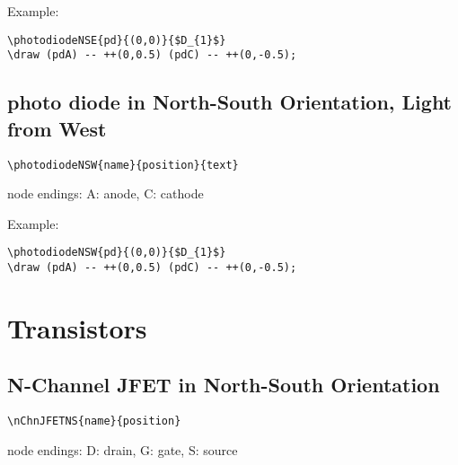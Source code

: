 \documentclass[parskip=full]{scrartcl}
\begin{document}
Example:\\
\begin{minipage}{0.8\textwidth}
\begin{verbatim}
\photodiodeNSE{pd}{(0,0)}{$D_{1}$}
\draw (pdA) -- ++(0,0.5) (pdC) -- ++(0,-0.5);
\end{verbatim}
\end{minipage}
\begin{minipage}{0.19\textwidth}
\end{minipage}

\subsection{photo diode in North-South Orientation, Light from West}

\begin{verbatim}
\photodiodeNSW{name}{position}{text}
\end{verbatim}
node endings: A: anode, C: cathode

Example:\\
\begin{minipage}{0.8\textwidth}
\begin{verbatim}
\photodiodeNSW{pd}{(0,0)}{$D_{1}$}
\draw (pdA) -- ++(0,0.5) (pdC) -- ++(0,-0.5);
\end{verbatim}
\end{minipage}
\begin{minipage}{0.19\textwidth}
\end{minipage}

\section{Transistors}

\subsection{N-Channel JFET in North-South Orientation}

\begin{verbatim}
\nChnJFETNS{name}{position}
\end{verbatim}
node endings: D: drain, G: gate, S: source
\end{document}
